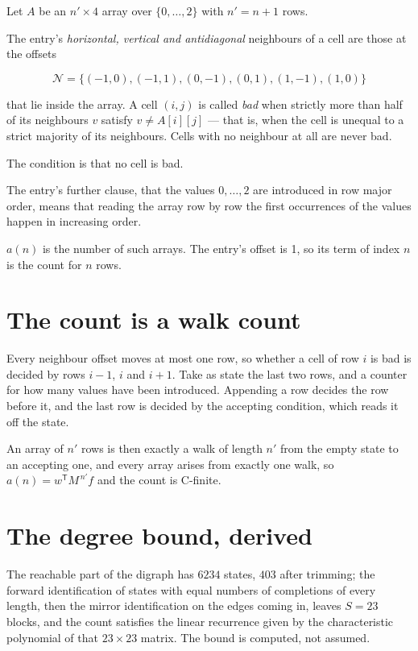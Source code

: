 \documentclass[11pt]{article}
\theoremstyle{definition}
\begin{document}
Let $A$ be an $n' \times 4$ array over $\{0,\dots,2\}$ with $n' = n + 1$ rows.

The entry's {\itshape horizontal, vertical and antidiagonal} neighbours of a cell are those at the offsets

\[\mathcal{N} = \{(-1,0), (-1,1), (0,-1), (0,1), (1,-1), (1,0)\}\]

that lie inside the array. A cell $(i,j)$ is called {\itshape bad} when strictly more than half of its neighbours $v$ satisfy $v \ne A[i][j]$ --- that is, when the cell is unequal to a strict majority of its neighbours. Cells with no neighbour at all are never bad.

The condition is that no cell is bad.

The entry's further clause, that the values $0,\dots,2$ are introduced in row major order, means that reading the array row by row the first occurrences of the values happen in increasing order.

$a(n)$ is the number of such arrays. The entry's offset is 1, so its term of index $n$ is the count for $n$ rows.

\section{The count is a walk count}

Every neighbour offset moves at most one row, so whether a cell of row $i$ is bad is decided by rows $i-1$, $i$ and $i+1$. Take as state the last two rows, and a counter for how many values have been introduced. Appending a row decides the row before it, and the last row is decided by the accepting condition, which reads it off the state.

An array of $n'$ rows is then exactly a walk of length $n'$ from the empty state to an accepting one, and every array arises from exactly one walk, so $a(n) = w^{\mathsf T}M^{\,n'}f$ and the count is C-finite.

\section{The degree bound, derived}

The reachable part of the digraph has $6234$ states, $403$ after trimming; the forward identification of states with equal numbers of completions of every length, then the mirror identification on the edges coming in, leaves $S = 23$ blocks, and the count satisfies the linear recurrence given by the characteristic polynomial of that $23\times23$ matrix. The bound is computed, not assumed.
\end{document}

